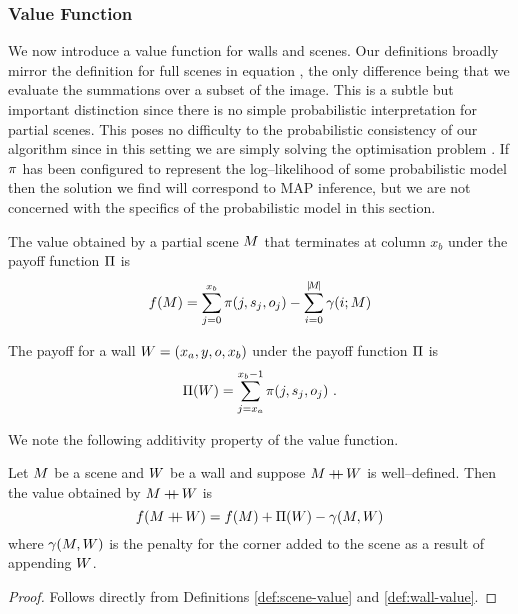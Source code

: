 \subsubsection{Value Function}

We now introduce a value function for walls and scenes. Our
definitions broadly mirror the definition for full scenes in equation
, the only difference being that we evaluate the
summations over a subset of the image. This is a subtle but important
distinction since there is no simple probabilistic
interpretation for partial scenes. This poses no difficulty to the
probabilistic consistency of our algorithm since in this setting we are
simply solving the optimisation problem . If
$\PixelPayoff$ has been configured to represent the log--likelihood of
some probabilistic model then the solution we find will correspond to
MAP inference, but we are not concerned with the specifics of the
probabilistic model in this section.

\begin{definition}
  \label{def:scene-value}
  The value obtained by a partial scene $\PartialScene$ that
  terminates at column $x_b$ under the payoff function $\ScenePayoff$
  is
  \begin{equation}
    \Objective(\PartialScene) = \sum_{j=0}^{x_b} 
      \PixelPayoff(j,\seam_j,\WallOrient_j) - 
      \sum_{i=0}^{\SceneLen} \CornerPenalty(i;\PartialScene)
    \label{eq:scene-value}
  \end{equation}
\end{definition}

\begin{definition}
  \label{def:wall-value}
  The payoff for a wall $\Wall=(x_a,y,\WallOrient,x_b)$ under the
  payoff function $\ScenePayoff$ is
  \begin{equation}
    \WallPayoff(\Wall) = \sum_{j=x_a}^{x_b-1}
      \PixelPayoff(j,\seam_j,\WallOrient_j) ~.
  \end{equation}
\end{definition}

We note the following additivity property of the value function.

\begin{lemma}
  \label{lemma:additive-values}
  Let $\Scene$ be a scene and $\Wall$ be a wall and suppose
  $\Scene\concat\Wall$ is well--defined. Then the value obtained by
  $\Scene\concat\Wall$ is
  \begin{equation}
    \Objective(\Scene\concat\Wall) = 
      \Objective(\Scene) + \WallPayoff(\Wall) - 
      \CornerPenalty(\Scene,\Wall)
  \end{equation}
  where $\CornerPenalty(\Scene,\Wall)$ is the penalty
  for the corner added to the scene as a result of appending $\Wall$.
\end{lemma}
\begin{proof}
  Follows directly from Definitions \ref{def:scene-value} and
  \ref{def:wall-value}.
\end{proof}

